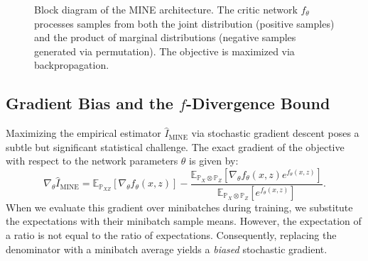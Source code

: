\begin{figure}[htpb]
\centering
{}
\caption{Block diagram of the MINE architecture. The critic network $f_\theta$ processes samples from both the joint distribution (positive samples) and the product of marginal distributions (negative samples generated via permutation). The objective is maximized via backpropagation.}
\label{fig:mine_arch}
\end{figure}

\subsection{Gradient Bias and the $f$-Divergence Bound}

Maximizing the empirical estimator $\widehat{I}_{\text{MINE}}$ via stochastic gradient descent poses a subtle but significant statistical challenge. The exact gradient of the objective with respect to the network parameters $\theta$ is given by:
\begin{equation}
\label{eq:mine_grad}
    \nabla_\theta \widehat{I}_{\text{MINE}} = \mathbb{E}_{\mathbb{P}_{XZ}}[\nabla_\theta f_\theta(x,z)] - \frac{\mathbb{E}_{\mathbb{P}_X \otimes \mathbb{P}_Z}[\nabla_\theta f_\theta(x,z) e^{f_\theta(x,z)}]}{\mathbb{E}_{\mathbb{P}_X \otimes \mathbb{P}_Z}[e^{f_\theta(x,z)}]}.
\end{equation}
When we evaluate this gradient over minibatches during training, we substitute the expectations with their minibatch sample means. However, the expectation of a ratio is not equal to the ratio of expectations. Consequently, replacing the denominator with a minibatch average yields a \emph{biased} stochastic gradient. 

